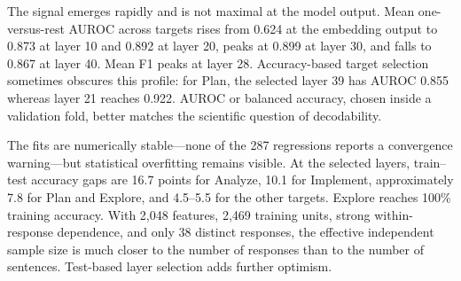 \documentclass[manuscript,screen,review]{jair}
\newcommand{\modelmetrics}[2]{\textit{Model(s):} #1. \textit{Metrics:} #2.}
\begin{document}
\begin{table}[t]
\centering
\caption{Accuracy-selected Schoenfeld boundary probes on the sentence-level
test split.  Prevalence is over all 3,087 units.  $\Delta$Maj. subtracts the
always-negative accuracy.  Balanced accuracy is derived from the saved test
confusion matrix.  Layer selection and evaluation use the same test split and
are therefore selection-optimistic.  \modelmetrics{
\texttt{Qwen/Qwen3.5-35B-A3B-GPTQ-Int4} as a frozen hidden-state encoder, with
one-versus-rest logistic probes}{target prevalence, selected hidden-state
layer, accuracy, accuracy minus the majority baseline, balanced accuracy, F1,
and AUROC}}
\label{tab:schoenfeld-boundary-probes}
\end{table}

The signal emerges rapidly and is not maximal at the model output.  Mean
one-versus-rest AUROC across targets rises from 0.624 at the embedding output
to 0.873 at layer 10 and 0.892 at layer 20, peaks at 0.899 at layer 30, and
falls to 0.867 at layer 40.  Mean F1 peaks at layer 28.  Accuracy-based target
selection sometimes obscures this profile: for Plan, the selected layer 39
has AUROC 0.855 whereas layer 21 reaches 0.922.  AUROC or balanced accuracy,
chosen inside a validation fold, better matches the scientific question of
decodability.

The fits are numerically stable---none of the 287 regressions reports a
convergence warning---but statistical overfitting remains visible.  At the
selected layers, train--test accuracy gaps are 16.7 points for Analyze, 10.1
for Implement, approximately 7.8 for Plan and Explore, and 4.5--5.5 for the
other targets.  Explore reaches 100\% training accuracy.  With 2,048 features,
2,469 training units, strong within-response dependence, and only 38 distinct
responses, the effective independent sample size is much closer to the number
of responses than to the number of sentences.  Test-based layer selection
adds further optimism.
\end{document}
